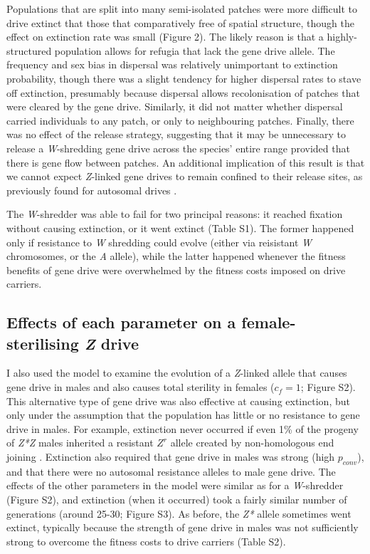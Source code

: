 \documentclass[]{rsos}%
\begin{document}
Populations that are split into many semi-isolated patches were more
difficult to drive extinct that those that comparatively free of spatial
structure, though the effect on extinction rate was small (Figure 2).
The likely reason is that a highly-structured population allows for
refugia that lack the gene drive allele. The frequency and sex bias in
dispersal was relatively unimportant to extinction probability, though
there was a slight tendency for higher dispersal rates to stave off
extinction, presumably because dispersal allows recolonisation of
patches that were cleared by the gene drive. Similarly, it did not
matter whether dispersal carried individuals to any patch, or only to
neighbouring patches. Finally, there was no effect of the release
strategy, suggesting that it may be unnecessary to release a
\emph{W}-shredding gene drive across the species' entire range provided
that there is gene flow between patches. An additional implication of
this result is that we cannot expect \emph{Z}-linked gene drives to
remain confined to their release sites, as previously found for
autosomal drives \citep{noble2018cu}.

The \emph{W}-shredder was able to fail for two principal reasons: it
reached fixation without causing extinction, or it went extinct (Table
S1). The former happened only if resistance to \emph{W} shredding could
evolve (either via reisistant \emph{W} chromosomes, or the \emph{A}
allele), while the latter happened whenever the fitness benefits of gene
drive were overwhelmed by the fitness costs imposed on drive carriers.

\hypertarget{effects-of-each-parameter-on-a-female-sterilising-z-drive}{%
\subsection{\texorpdfstring{Effects of each parameter on a
female-sterilising \emph{Z}
drive}{Effects of each parameter on a female-sterilising Z drive}}\label{effects-of-each-parameter-on-a-female-sterilising-z-drive}}

I also used the model to examine the evolution of a \emph{Z}-linked
allele that causes gene drive in males and also causes total sterility
in females (\(c_f = 1\); Figure S2). This alternative type of gene drive
was also effective at causing extinction, but only under the assumption
that the population has little or no resistance to gene drive in males.
For example, extinction never occurred if even 1\% of the progeny of
\emph{Z*Z} males inherited a resistant \(Z^r\) allele created by
non-homologous end joining \citep[c.f.][]{unckless2017ev}. Extinction
also required that gene drive in males was strong (high \(p_{conv}\)),
and that there were no autosomal resistance alleles to male gene drive.
The effects of the other parameters in the model were similar as for a
\emph{W}-shredder (Figure S2), and extinction (when it occurred) took a
fairly similar number of generations (around 25-30; Figure S3). As
before, the \emph{Z*} allele sometimes went extinct, typically because
the strength of gene drive in males was not sufficiently strong to
overcome the fitness costs to drive carriers (Table S2).
\end{document}
